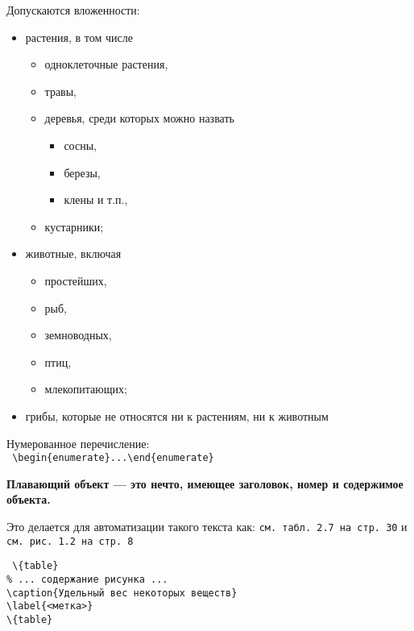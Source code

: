 \noindent
Допускаются вложенности:
\begin{itemize}
    \item растения, в том числе
    \begin{itemize}
        \item одноклеточные растения,
        \item травы,
        \item деревья, среди которых можно назвать
        \begin{itemize}
            \item сосны,
            \item березы,
            \item клены и т.п.,
        \end{itemize}
        \item кустарники;
    \end{itemize}
    \item животные, включая
    \begin{itemize}
        \item простейших,
        \item рыб,
        \item земноводных,
        \item птиц,
        \item млекопитающих;
    \end{itemize}
    \item грибы, которые не относятся ни к растениям, ни к животным
\end{itemize}


\noindent
Нумерованное перечисление:\\
\texttt{
\textbackslash begin\{enumerate\}...\textbackslash end\{enumerate\}}

\clearpage

\noindent
\textbf{
Плавающий объект --- это нечто, имеющее заголовок, номер и содержимое объекта.}\\
\medskip

\noindent
Это делается для автоматизации такого текста как: \texttt{см.~табл.\,2.7 на стр.\,30} и \texttt{см.~рис.\,1.2 на стр.\,8}\\
\medskip

\noindent
\texttt{
\textbackslash \{table\}\\
\phantom{~~~~}\% ... содержание рисунка ...\\
\phantom{~~~~}\textbackslash caption\{Удельный вес некоторых веществ\}\\
\phantom{~~~~}\textbackslash label\{<метка>\}\\
\textbackslash \{table\}}\\
\medskip

